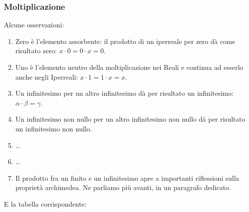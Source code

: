\subsubsection{Moltiplicazione}
\label{subsec:insnum_moltiplicazione}

\noindent \begin{minipage}{.5\textwidth}
Alcune osservazioni:
\begin{enumerate} [noitemsep]
 \item Zero è l'elemento assorbente: il prodotto di un iperreale per zero
dà come risultato zero: $x \cdot 0=0 \cdot x=0$.
 \item Uno è l'elemento neutro della moltiplicazione nei Reali e continua ad 
esserlo anche negli Iperreali: $x \cdot 1=1 \cdot x=x$.
 \item Un infinitesimo per un altro infinitesimo dà per risultato un 
infinitesimo: $\alpha \cdot \beta=\gamma$.
 \item Un infinitesimo non nullo per un altro infinitesimo non nullo dà 
per risultato un infinitesimo non nullo.
 \item \dots
 \item \dots
 \item Il prodotto fra un finito e un infinitesimo apre a importanti riflessioni
sulla proprietà archimedea. Ne parliamo più avanti, in un paragrafo dedicato.
 \end{enumerate}
\end{minipage}
\hfill
\begin{minipage}{.45\textwidth}
E la tabella corrispondente:
\begin{center}
\renewcommand{\arraystretch}{.0}
\end{center}
\vspace{2mm}
\end{minipage}

